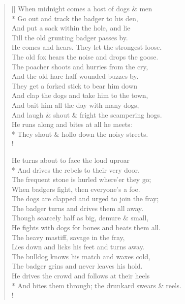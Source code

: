 \documentclass[MAIN]{subfiles}
\begin{document}
\settowidth{\versewidth}{He comes and hears. They let the strongest loose.}
\begin{verse}[\versewidth]
When midnight comes a host of dogs \& men\\*
Go out and track the badger to his den,\\
And put a sack within the hole, and lie\\
Till the old grunting badger passes by.\\
He comes and hears. They let the strongest loose.\\
The old fox hears the noise and drops the goose.\\
The poacher shoots and hurries from the cry,\\
And the old hare half wounded buzzes by.\\
They get a forked stick to bear him down\\
And clap the dogs and take him to the town,\\
And bait him all the day with many dogs,\\
And laugh \& shout \& fright the scampering hogs.\\
He runs along and bites at all he meets:\\*
They shout \& hollo down the noisy streets.\\!

He turns about to face the loud uproar\\*
And drives the rebels to their very door.\\
The frequent stone is hurled where'er they go;\\
When badgers fight, then everyone's a foe.\\
The dogs are clapped and urged to join the fray;\\
The badger turns and drives them all away.\\
Though scarcely half as big, demure \& small,\\
He fights with dogs for bones and beats them all.\\
The heavy mastiff, savage in the fray,\\
Lies down and licks his feet and turns away.\\
The bulldog knows his match and waxes cold,\\
The badger grins and never leaves his hold.\\
He drives the crowd and follows at their heels\\*
And bites them through; the drunkard swears \& reels.\\!


\end{verse}
\end{document}
